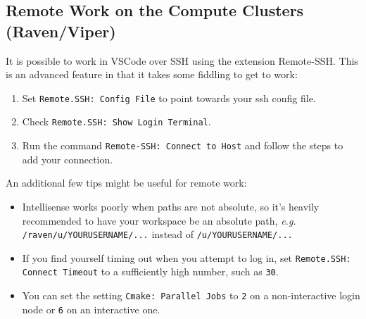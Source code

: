 \documentclass[11pt]{article}
\begin{document}
\subsection{Remote Work on the Compute Clusters (Raven/Viper)}
It is possible to work in VSCode over SSH using the extension Remote-SSH. This is an advanced feature in that it takes some fiddling to get to work:
\begin{enumerate}
   \item Set \verb|Remote.SSH: Config File| to point towards your ssh config file.
   \item Check \verb|Remote.SSH: Show Login Terminal|.
   \item Run the command \verb|Remote-SSH: Connect to Host| and follow the steps to add your connection.
\end{enumerate}

An additional few tips might be useful for remote work:
\begin{itemize}
   \item Intellisense works poorly when paths are not absolute, so it's heavily recommended to have your workspace be an absolute path, \emph{e.g.} \verb|/raven/u/YOURUSERNAME/...| instead of \verb|/u/YOURUSERNAME/...|
   \item If you find yourself timing out when you attempt to log in, set \verb|Remote.SSH: Connect Timeout| to a sufficiently high number, such as \verb|30|.
   \item You can set the setting \verb|Cmake: Parallel Jobs| to \verb|2| on a non-interactive login node or \verb|6| on an interactive one.
\end{itemize}
\end{document}
